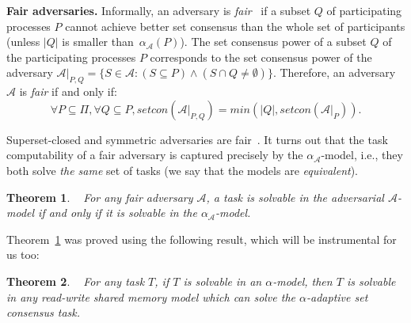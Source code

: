 \documentclass[a4paper]{article}
\newtheorem{theorem}{Theorem}
\newtheorem{definition}{Definition}
\newcommand{\myparagraph}[1]{\vspace{6pt}\noindent \textbf{#1}}
\newcommand{\remove}[1]{}
\def\A{\ensuremath{\mathcal{A}}}
\def\fair{\textit{fair}}
\def\Fair{\textit{Fair}}
\newcommand{\setcon}{\mathit{setcon}}
\begin{document}
\myparagraph{Fair adversaries.}
%
Informally, an adversary is \emph{{\fair}}~\cite{KR17} if a subset $Q$ of
participating processes $P$ cannot achieve better set consensus than the
whole set of participants (unless $|Q|$ is smaller than~$\alpha_{\A}(P)$).
The set consensus power of a subset $Q$ of the participating processes $P$
corresponds to the set consensus power of the adversary 
$\A|_{P,Q} = \{S\in\A:(S\subseteq P)\wedge(S\cap Q\neq\emptyset)\}.$
Therefore, an adversary $\A$ is {\fair} if and only if:
\[\forall P \subseteq \Pi, \forall Q\subseteq P, \setcon(\A|_{P,Q})= min(|Q|,\setcon(\A|_P)){}.\]

Superset-closed and symmetric adversaries are fair~\cite{KR17}.
%
It turns out that the task computability of a fair adversary is
captured precisely by the $\alpha_\A$-model, i.e.,
they both solve \emph{the same} set of tasks
(we say that the models are \emph{equivalent}).

\begin{theorem}~\cite{KR17}
\label{th:adv:task}
For any {\fair} adversary $\A$, a task is solvable in the adversarial
$\A$-model if and only if it is solvable in the $\alpha_\A$-model. %
\end{theorem} 
%

Theorem~\ref{th:adv:task} was proved using the following result, which
will be instrumental for us too:
\begin{theorem}~\cite{KR17}
\label{read/writeAndConsensus}
For any task $T$, if $T$ is solvable in an $\alpha$-model, then $T$ is solvable in \emph{any} read-write shared 
memory model which can solve the $\alpha$-adaptive set consensus task.
\end{theorem}

\remove{
%
\begin{theorem}~\cite{KR17}
  \label{thm:AdaptiveAgreement}
There exists an \emph{$\alpha$-adaptive}  set consensus algorithm
that, in any run with a participating set $P$,
satisfies the following properties: (\emph{Termination}) All \emph{correct} processes
eventually decide;
%
(\emph{Agreement}) At most $\alpha(P)$ different values are decided,
with $P$ the participation at the earliest time a process decided;
%
(\emph{Validity}) Each decided value has been proposed by some process.
\end{theorem}
}
\end{document}
